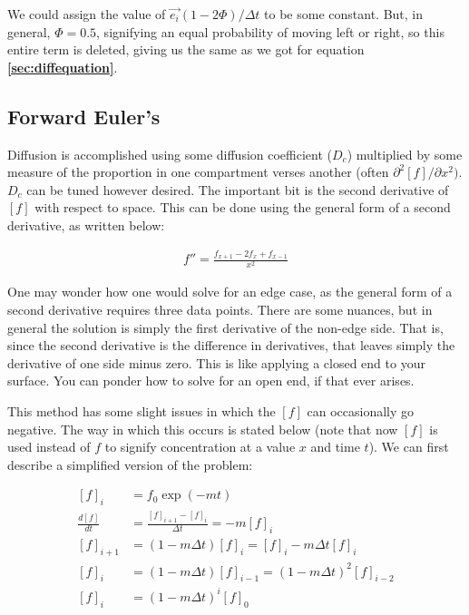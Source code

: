 We could assign the value of $\Vec{e_i}(1-2\Phi) /\Delta t$ to be some constant. But, in general, $\Phi = 0.5$, signifying an equal probability of moving left or right, so this entire term is deleted, giving us the same as we got for equation \textbf{\ref{sec:diffequation}}. 



\subsection{Forward Euler's} Diffusion is accomplished using some diffusion coefficient ($D_c$) multiplied by some measure of the proportion in one compartment verses another (often $\partial^2 [f]/\partial x^2)$. $D_c$ can be tuned however desired. The important bit is the second derivative of $[f]$ with respect to space. This can be done using the general form of a second derivative, as written below: 

\begin{equation} \label{diff1}
\begin{split}
f'' = \frac{f_{x + 1} - 2f_x + f_{x - 1}}{x^2}
\end{split}
\end{equation}

\bigskip

One may wonder how one would solve for an edge case, as the general form of a second derivative requires three data points. There are some nuances, but in general the solution is simply the first derivative of the non-edge side. That is, since the second derivative is the difference in derivatives, that leaves simply the derivative of one side minus zero. This is like applying a closed end to your surface. You can ponder how to solve for an open end, if that ever arises.\newline

This method has some slight issues in which the $[f]$ can occasionally go negative. The way in which this occurs is stated below (note that now $[f]$ is used instead of $f$ to signify concentration at a value $x$ and time $t$). We can first describe a simplified version of the problem:

\begin{equation} \label{diff2}
\begin{split}
[f]_i & = f_0\exp(-mt) \\
\frac{d[f]}{dt} & = \frac{[f]_{i+1} - [f]_{i}}{\Delta t} = -m[f]_i \\
[f]_{i+1} & = (1-m\Delta t)[f]_i = [f]_i - m\Delta t [f]_i \\
[f]_{i} & = (1-m\Delta t)[f]_{i-1} = (1-m\Delta t)^2[f]_{i-2} \\
[f]_{i} & = (1-m\Delta t)^i[f]_{0} \\
\end{split}
\end{equation}

